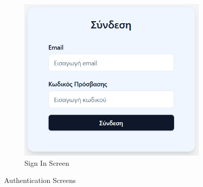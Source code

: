 \documentclass[12pt,a4paper,twoside]{book}
\begin{document}
\begin{figure}[H]
\begin{subfigure}[b]{0.48\textwidth}
        \centering
        \includegraphics[width=\textwidth]{Mockup Screens/mockup-login1.png}
        \caption{Sign In Screen}\label{fig:mockup2}
    \end{subfigure}
    \caption{Authentication Screens}\label{fig:auth-screens}
\end{figure}
\end{document}
